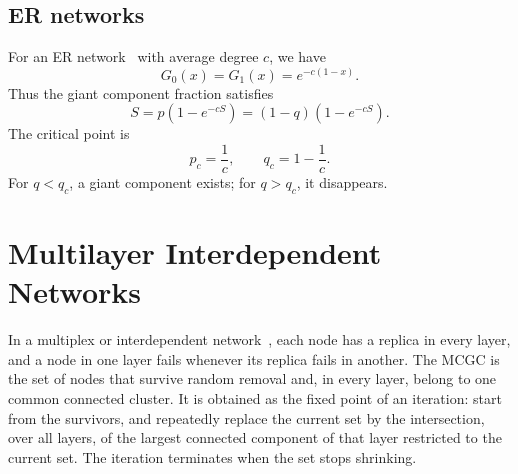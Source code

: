 \documentclass[11pt]{article}
\begin{document}
\subsection{ER networks}
For an ER network~\cite{erdos1960} with average degree $c$, we have
\begin{equation}
  G_0(x)=G_1(x)=e^{-c(1-x)}.
\end{equation}
Thus the giant component fraction satisfies
\begin{equation}
  S = p(1-e^{-cS}) = (1-q)(1-e^{-cS}).
\end{equation}
The critical point is
\begin{equation}
  p_c = \frac{1}{c},\qquad q_c = 1-\frac{1}{c}.
\end{equation}
For $q<q_c$, a giant component exists; for $q>q_c$, it disappears.

\section{Multilayer Interdependent Networks}\label{sec:multi}
In a multiplex or interdependent network~\cite{buldyrev2010}, each node has a replica in every layer, and a node in one layer fails whenever its replica fails in another. The MCGC is the set of nodes that survive random removal and, in every layer, belong to one common connected cluster. It is obtained as the fixed point of an iteration: start from the survivors, and repeatedly replace the current set by the intersection, over all layers, of the largest connected component of that layer restricted to the current set. The iteration terminates when the set stops shrinking.
\end{document}
